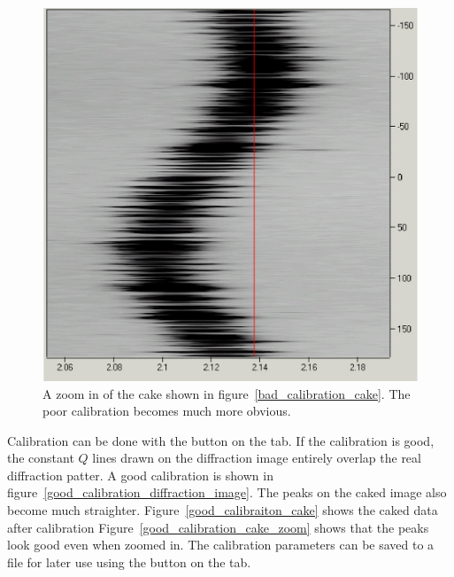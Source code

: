 \begin{figure}
    \centering
    \includegraphics[scale=.75]
    {figures/bad_calibration_cake_zoom.eps}
    \caption{A zoom in of the cake shown in 
    figure~\ref{bad_calibration_cake}. The poor calibration 
    becomes much more obvious.}
    \label{bad_calibration_cake_zoom}
\end{figure}

Calibration can be done with the  button 
on the  tab. If the calibration is good, 
the constant $Q$ lines drawn on the diffraction image 
entirely overlap the real diffraction patter. 
A good calibration is shown in 
figure~\ref{good_calibration_diffraction_image}.
The peaks on the caked image also become much straighter.
Figure~\ref{good_calibraiton_cake} shows the caked data after calibration 
Figure~\ref{good_calibration_cake_zoom} shows that the peaks
look good even when zoomed in.
The calibration parameters can be saved to 
a file for later use using the  button on the 
 tab. 

